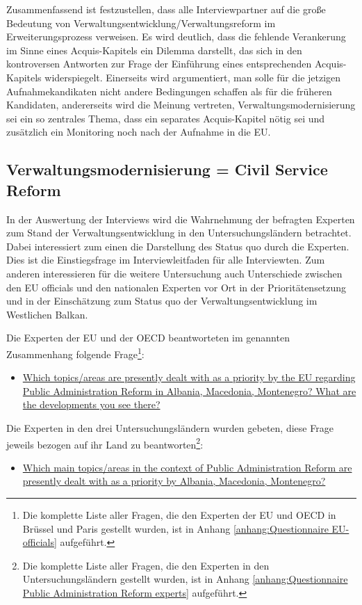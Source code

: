 Zusammenfassend ist festzustellen, dass alle Interviewpartner auf die große Bedeutung von Verwaltungsentwicklung/Verwaltungsreform im Erweiterungsprozess verweisen. Es wird deutlich, dass die fehlende Verankerung im Sinne eines Acquis-Kapitels ein Dilemma darstellt, das sich in den kontroversen Antworten zur Frage der Einführung eines entsprechenden Acquis-Kapitels widerspiegelt. Einerseits wird argumentiert, man solle für die jetzigen Aufnahmekandikaten nicht andere Bedingungen schaffen als für die früheren Kandidaten, andererseits wird die Meinung vertreten, Verwaltungsmodernisierung sei ein so zentrales Thema, dass ein separates Acquis-Kapitel nötig sei und zusätzlich ein Monitoring noch nach der Aufnahme in die EU.

\subsection{Verwaltungsmodernisierung = Civil Service Reform }
In der Auswertung der Interviews wird die Wahrnehmung der befragten Experten zum Stand der Verwaltungsentwicklung in den Untersuchungsländern betrachtet. Dabei interessiert zum einen die Darstellung des Status quo durch die Experten. Dies ist die Einstiegsfrage im Interviewleitfaden für alle Interviewten. Zum anderen interessieren für die weitere Untersuchung auch Unterschiede zwischen den EU officials und den nationalen Experten vor Ort in der Prioritätensetzung und in der Einschätzung zum Status quo der Verwaltungsentwicklung im Westlichen Balkan. 

Die Experten der EU und der OECD beantworteten im genannten Zusammenhang folgende Frage\footnote{Die komplette Liste aller Fragen, die den Experten der EU und OECD in Brüssel und Paris gestellt wurden, ist in Anhang \ref{anhang:Questionnaire EU-officials} aufgeführt.}:
\begin{itemize}[label={}]
\item \ul{Which topics/areas are presently dealt with as a priority by the EU regarding Public Administration Reform in Albania, Macedonia, Montenegro? What are the developments you see there?}
\end{itemize}

Die Experten in den drei Untersuchungsländern wurden gebeten, diese Frage jeweils bezogen auf ihr Land zu beantworten\footnote{Die komplette Liste aller Fragen, die den Experten in den Untersuchungsländern gestellt wurden, ist in Anhang \ref{anhang:Questionnaire Public Administration Reform experts} aufgeführt.}:
\begin{itemize}[label={}]
\item \ul{Which main topics/areas in the context of Public Administration Reform are presently dealt with as a priority by Albania, Macedonia, Montenegro?}
\end{itemize}


